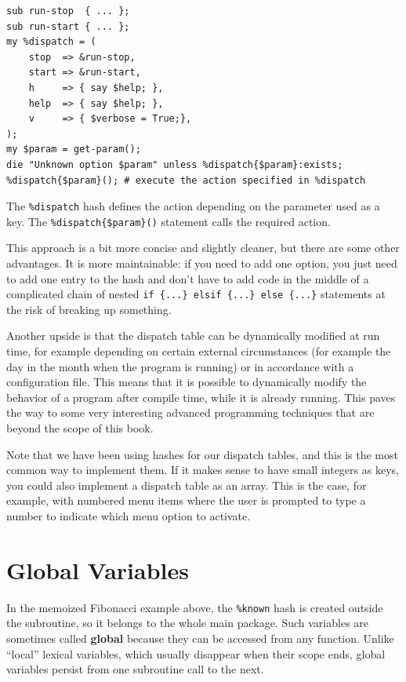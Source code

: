 \begin{verbatim}
sub run-stop  { ... };
sub run-start { ... };
my %dispatch = (
    stop  => &run-stop,
    start => &run-start,
    h     => { say $help; },
    help  => { say $help; },
    v     => { $verbose = True;},
);
my $param = get-param();
die "Unknown option $param" unless %dispatch{$param}:exists;
%dispatch{$param}(); # execute the action specified in %dispatch
\end{verbatim}

The \verb'%dispatch' hash defines the action depending on 
the parameter used as a key. The \verb'%dispatch{$param}()' 
statement calls the required action.

This approach is a bit more concise and slightly cleaner, but there 
are some other advantages. It is more maintainable: if you need 
to add one option, you just need to add one entry to the hash 
and don't have to add code in the middle of a complicated 
chain of nested \verb'if {...} elsif {...} else {...}' 
statements at the risk of breaking up something. 

Another upside is that the dispatch table can be dynamically 
modified at run time, for example depending on certain 
external circumstances (for example the day in the month when 
the program is running) or in accordance with a configuration 
file. This means that it is possible to dynamically modify 
the behavior of a program after compile time, while it is 
already running. This paves the way to some very interesting 
advanced programming techniques that are beyond the scope 
of this book.

Note that we have been using hashes for our dispatch tables, 
and this is the most common way to implement them. If it 
makes sense to have small integers as keys, you could also 
implement a dispatch table as an array. This is the case, 
for example, with numbered menu items where the user is 
prompted to type a number to indicate which menu option 
to activate.


\section{Global Variables}

In the memoized Fibonacci example above, the 
\verb'%known' hash is created outside the subroutine,
so it belongs to the whole main package.
Such variables are sometimes called {\bf global} 
because they can be accessed from any function.  Unlike ``local'' 
lexical variables, which usually disappear when their scope 
ends, global variables persist from one subroutine call to 
the next.

